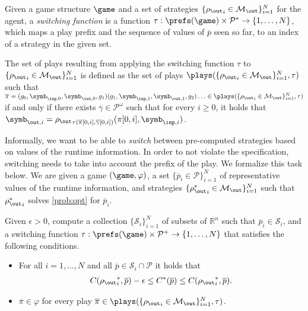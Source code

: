 \begin{defn}
Given a game structure $\game$ and a set of strategies $\{{\rho_\out}_i\in \mathcal{M}_\out\}_{i=1}^N$ for the agent, a \emph{switching function} is a function $\tau : \prefs(\game) \times \mathcal P^* \to \{1,\ldots,N\}$, which maps a play prefix and the sequence of values of $\overline p$ seen so far, to an index of a strategy in the given set.

The set of plays resulting from applying the switching function $\tau$ to $\{{\rho_\out}_i\in \mathcal{M}_\out\}_{i=1}^{N}$ is defined as the set of plays 
$\plays(\{{\rho_\out}_i\in\mathcal{M}_\out\}_{i=1}^{N},\tau)$ such that 
$\overline{\pi} = (g_0,\symb_{\inp,0},\symb_{\out,0}, g_1) 
(g_1,\symb_{\inp,1}, \symb_{\out,1}, g_2) \ldots \in \plays(\{{\rho_\out}_i\in \mathcal{M}_\out\}_{i=1}^{N},\tau)$
if and only if there exists $\overline \gamma \in \mathcal{P}^\omega$ such that
for every $i \geq 0$,  it holds that $\symb_{\out,i} ={\rho_\out}_{\tau(\overline \pi[0,i],\overline \gamma[0,i])}(\pi[0,i],\symb_{\inp,i})$.
\end{defn}

Informally, we want to be able to \emph{switch} between pre-computed strategies based on values of the runtime information. In order to not violate the specification, switching needs to take into account the prefix of the play. We formalize this task below. 
   We are given a game $(\game,\varphi)$, 
   a set $\{\overline{p}_i\in \mathcal{P}\}_{i=1}^{N}$ of representative values of the runtime information, and 
    strategies $\{{\rho_\out^\ast}_i\in \mathcal{M}_\out\}_{i=1}^{N}$ such that ${\rho_\out^\ast}_i$ solves \eqref{prob:opt} for $\overline{p}_i$. 

   Given $\epsilon > 0$, compute a collection $\{\mathcal S_i\}_{i=1}^N$ of subsets of $\mathbb{R}^n$ such that $\overline{p}_i \in \mathcal{S}_i$, and a  switching function $\tau : \prefs(\game) \times \mathcal P^+ \to \{1,\ldots,N\}$ that satisfies the following conditions.
   \begin{itemize}
       \item For all $i =1,\ldots,N$ and all $\overline p \in \mathcal S_i \cap \mathcal P$ it holds that
    \begin{align}
  C({\rho_\out}_i^\ast,
    \overline{p}) - \epsilon \leq
        C^\ast(\overline{p}) \leq
        C({\rho_\out}_i^\ast,
    \overline{p}).
    \label{eq:bounds}
   \end{align}  
   \item $\overline\pi \in \varphi$ for every play $\overline \pi \in \plays(\{{\rho_\out}_i\in\mathcal{M}_\out\}_{i=1}^{N},\tau)$.
   \end{itemize}


